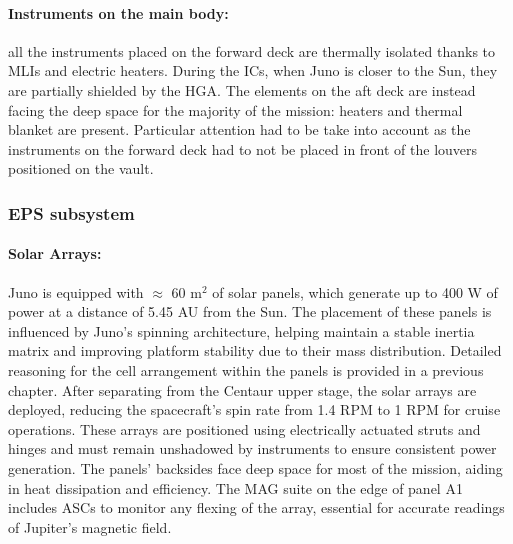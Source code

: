\paragraph{Instruments on the main body:} all the instruments placed on the forward deck are thermally isolated thanks to MLIs and electric heaters. During the ICs, when Juno is closer to the Sun, they are partially shielded by the HGA.\cite{JADE_info}\cite{JEDI_info} The elements on the aft deck are instead facing the deep space for the majority of the mission: heaters and thermal blanket are present.\cite{Waves_info} Particular attention had to be take into account as the instruments on the forward deck had to not be placed in front of the louvers positioned on the vault. 

\subsubsection{EPS subsystem}
\label{subsubsec:eps_sub}

\vspace{-2mm}

\paragraph{Solar Arrays:} Juno is equipped with $\approx$ 60 m$^2$ of solar panels, which generate up to 400 W of power at a distance of 5.45 AU from the Sun.\cite{pannelli} The placement of these panels is influenced by Juno's spinning architecture, helping maintain a stable inertia matrix and improving platform stability due to their mass distribution.\cite{solar_panels_coef} Detailed reasoning for the cell arrangement within the panels is provided in a previous chapter. After separating from the Centaur upper stage, the solar arrays are deployed, reducing the spacecraft's spin rate from 1.4 RPM to 1 RPM for cruise operations.\cite{Juno_launch} These arrays are positioned using electrically actuated struts and hinges and must remain unshadowed by instruments to ensure consistent power generation. The panels' backsides face deep space for most of the mission, aiding in heat dissipation and efficiency. The MAG suite on the edge of panel A1 includes ASCs to monitor any flexing of the array, essential for accurate readings of Jupiter's magnetic field. 

\vspace{-4mm}


